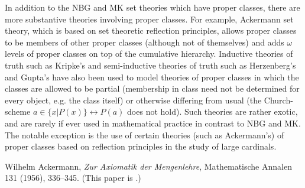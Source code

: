 \documentclass[12pt]{article}
\begin{document}
In addition to the NBG and MK set theories which have proper classes, there are more substantive theories involving proper classes. For example, Ackermann set theory\cite{ackermann}, which is based on set theoretic reflection principles, allows proper classes to be members of other proper classes (although not of themselves) and adds $\omega$ levels of proper classes on top of the cumulative hierarchy. Inductive theories of truth such as Kripke's and semi-inductive theories of truth such as Herzenberg's and Gupta's have also been used to model theories of proper classes in which the classes are allowed to be partial (membership in class need not be determined for every object, e.g. the class itself) or otherwise differing from usual (the Church-scheme $a \in \{x|P(x)\}\leftrightarrow P(a)$ does not hold). Such theories are rather exotic, and are rarely if ever used in mathematical practice in contrast to NBG and MK. The notable exception is the use of certain theories (such as Ackermann's) of proper classes based on reflection principles in the study of large cardinals.

\begin{thebibliography}{9}
 Wilhelm Ackermann,
 {\it Zur Axiomatik der Mengenlehre},
 Mathematische Annalen 131 (1956), 336--345. (This paper is .)
\end{thebibliography}
\end{document}
